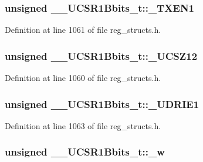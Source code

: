 \hypertarget{union_____u_c_s_r1_bbits__t_a75b771df2dc77eb637b2bafe1e28bb72}{
\subsubsection[{\+\_\+\+T\+X\+E\+N1}]{\setlength{\rightskip}{0pt plus 5cm}unsigned \+\_\+\+\_\+\+U\+C\+S\+R1\+Bbits\+\_\+t\+::\+\_\+\+T\+X\+E\+N1}}\label{union_____u_c_s_r1_bbits__t_a75b771df2dc77eb637b2bafe1e28bb72}


Definition at line 1061 of file reg\+\_\+structs.\+h.

\hypertarget{union_____u_c_s_r1_bbits__t_a8d4204150d3c2332ee3bacf2a4675203}{
\subsubsection[{\+\_\+\+U\+C\+S\+Z12}]{\setlength{\rightskip}{0pt plus 5cm}unsigned \+\_\+\+\_\+\+U\+C\+S\+R1\+Bbits\+\_\+t\+::\+\_\+\+U\+C\+S\+Z12}}\label{union_____u_c_s_r1_bbits__t_a8d4204150d3c2332ee3bacf2a4675203}


Definition at line 1060 of file reg\+\_\+structs.\+h.

\hypertarget{union_____u_c_s_r1_bbits__t_ac0c89c19a205c1b62466eed17f35ef6f}{
\subsubsection[{\+\_\+\+U\+D\+R\+I\+E1}]{\setlength{\rightskip}{0pt plus 5cm}unsigned \+\_\+\+\_\+\+U\+C\+S\+R1\+Bbits\+\_\+t\+::\+\_\+\+U\+D\+R\+I\+E1}}\label{union_____u_c_s_r1_bbits__t_ac0c89c19a205c1b62466eed17f35ef6f}


Definition at line 1063 of file reg\+\_\+structs.\+h.

\hypertarget{union_____u_c_s_r1_bbits__t_ad2247e39b7d674d98bd9ae5cdc82132e}{
\subsubsection[{\+\_\+w}]{\setlength{\rightskip}{0pt plus 5cm}unsigned \+\_\+\+\_\+\+U\+C\+S\+R1\+Bbits\+\_\+t\+::\+\_\+w}}\label{union_____u_c_s_r1_bbits__t_ad2247e39b7d674d98bd9ae5cdc82132e}


